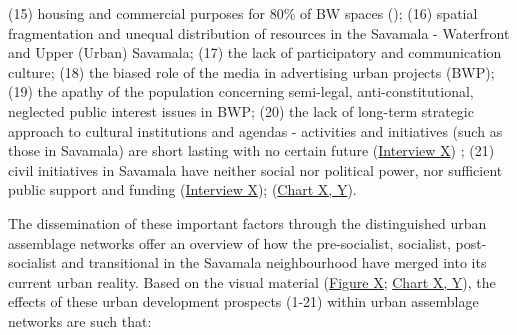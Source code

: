 \documentclass[11pt]{report}
\begin{document}
(15) housing and commercial purposes for 80\% of BW spaces (\href{Zekovic}{\citealt{zekovic_megaprojects_2016}}); 
(16) spatial fragmentation and unequal distribution of resources in the Savamala - Waterfront and Upper (Urban) Savamala;
(17) the lack of participatory and communication culture;
(18) the biased role of the media in advertising urban projects (BWP);
(19) the apathy of the population concerning semi-legal, anti-constitutional, neglected public interest issues in BWP;
(20) the lack of long-term strategic approach to cultural institutions and agendas - activities and initiatives (such as those in Savamala) are short lasting with no certain future (\href{InterviewX}{Interview X})
; 
(21) civil initiatives in Savamala have neither social nor political power, nor sufficient public support and funding (\href{InterviewX}{Interview X});
(\href{Table 5, 6}{Chart X, Y}). 

The dissemination of these important factors through the distinguished urban assemblage networks offer an overview of how the pre-socialist, socialist, post-socialist and transitional in the Savamala neighbourhood have merged into its current urban reality.
Based on the visual material (\href{ANT diagram}{Figure X}; \href{aspect tables 5,6}{Chart X, Y}), the effects of these urban development prospects (1-21) within urban assemblage networks are such that:
\\
\end{document}
